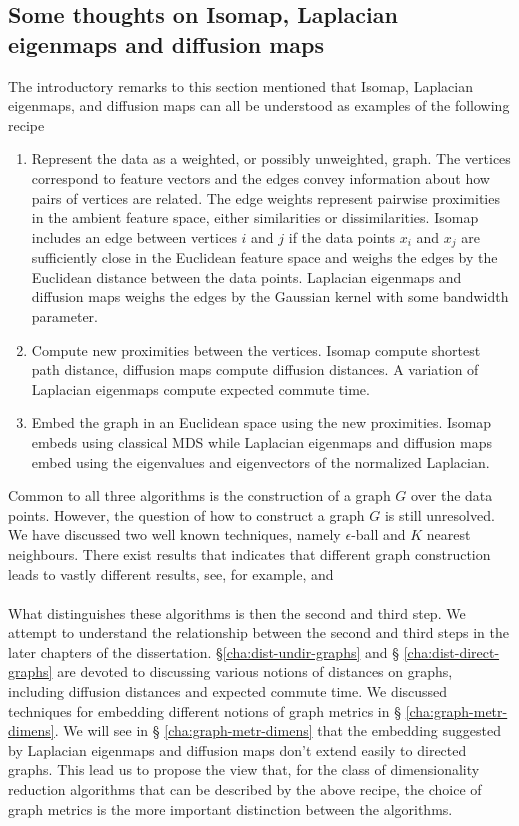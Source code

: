 \subsection{Some thoughts on Isomap, Laplacian eigenmaps and diffusion maps}
\label{sec:some-thoughts-isomap}
The introductory remarks to this section mentioned that Isomap,
Laplacian eigenmaps, and diffusion maps can all be understood as
examples of the following recipe
\begin{enumerate}
\item Represent the data as a weighted, or possibly unweighted,
  graph. The vertices correspond to feature vectors and the edges
  convey information about how pairs of vertices are related. The edge
  weights represent pairwise proximities in the ambient feature space,
  either similarities or dissimilarities. Isomap includes an edge
  between vertices $i$ and $j$ if the data points $x_i$ and $x_j$ are
  sufficiently close in the Euclidean feature space and weighs the
  edges by the Euclidean distance between the data points. Laplacian
  eigenmaps and diffusion maps weighs the edges by the Gaussian
  kernel with some bandwidth parameter.
\item Compute new proximities between the vertices. Isomap compute
  shortest path distance, diffusion maps compute diffusion
  distances. A variation of Laplacian eigenmaps compute expected
  commute time.
\item Embed the graph in an Euclidean space using the new
  proximities. Isomap embeds using classical MDS while Laplacian
  eigenmaps and diffusion maps embed using the eigenvalues and
  eigenvectors of the normalized Laplacian. 
\end{enumerate}
Common to all three algorithms is the construction of a graph $G$ over
the data points. However, the question of how to construct a graph $G$
is still unresolved. We have discussed two well known techniques,
namely $\epsilon$-ball and $K$ nearest neighbours. There exist results
that indicates that different graph construction leads to vastly
different results, see, for example,
\citet{maier08:_influen} and \citet{hein07:_conver_laplac} \\ \\
%
%
\noindent
What distinguishes these algorithms is then the second and third
step. We attempt to understand the relationship between the second and
third steps in the later chapters of the dissertation. \S \ref{cha:dist-undir-graphs} and \S
\ref{cha:dist-direct-graphs} are devoted to discussing various notions
of distances on graphs, including diffusion distances and expected
commute time. We discussed techniques for
embedding different notions of graph metrics in \S
\ref{cha:graph-metr-dimens}. We will see in \S
\ref{cha:graph-metr-dimens} that the embedding suggested by
Laplacian eigenmaps and diffusion maps don't extend easily to
directed graphs. This lead us to propose the view that, for the class of
dimensionality reduction algorithms that can be described by the above
recipe, the choice of graph metrics is the more important distinction
between the algorithms.  
%
%

